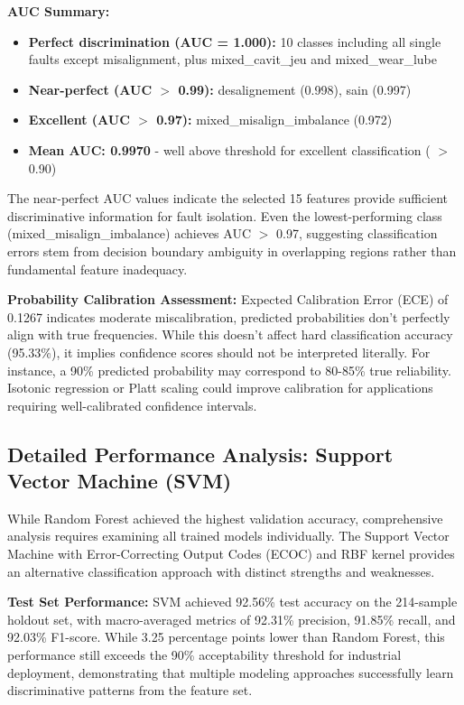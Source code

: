 \documentclass[11pt,a4paper]{article}
\begin{document}
\textbf{AUC Summary:}
\begin{itemize}[itemsep=0.2em]
    \item \textbf{Perfect discrimination (AUC = 1.000):} 10 classes including all single faults except misalignment, plus mixed\_cavit\_jeu and mixed\_wear\_lube
    \item \textbf{Near-perfect (AUC  $>$   0.99):} desalignement (0.998), sain (0.997)
    \item \textbf{Excellent (AUC  $>$  0.97):} mixed\_misalign\_imbalance (0.972)
    \item \textbf{Mean AUC: 0.9970} - well above threshold for excellent classification ( $>$ 0.90)
\end{itemize}

The near-perfect AUC values indicate the selected 15 features provide sufficient discriminative information for fault isolation. Even the lowest-performing class (mixed\_misalign\_imbalance) achieves AUC  $>$  0.97, suggesting classification errors stem from decision boundary ambiguity in overlapping regions rather than fundamental feature inadequacy.

\textbf{Probability Calibration Assessment:} Expected Calibration Error (ECE) of 0.1267 indicates moderate miscalibration, predicted probabilities don't perfectly align with true frequencies. While this doesn't affect hard classification accuracy (95.33\%), it implies confidence scores should not be interpreted literally. For instance, a 90\% predicted probability may correspond to 80-85\% true reliability. Isotonic regression or Platt scaling could improve calibration for applications requiring well-calibrated confidence intervals.

\subsection{Detailed Performance Analysis: Support Vector Machine (SVM)}

While Random Forest achieved the highest validation accuracy, comprehensive analysis requires examining all trained models individually. The Support Vector Machine with Error-Correcting Output Codes (ECOC) and RBF kernel provides an alternative classification approach with distinct strengths and weaknesses.

\textbf{Test Set Performance:} SVM achieved 92.56\% test accuracy on the 214-sample holdout set, with macro-averaged metrics of 92.31\% precision, 91.85\% recall, and 92.03\% F1-score. While 3.25 percentage points lower than Random Forest, this performance still exceeds the 90\% acceptability threshold for industrial deployment, demonstrating that multiple modeling approaches successfully learn discriminative patterns from the feature set.
\end{document}
